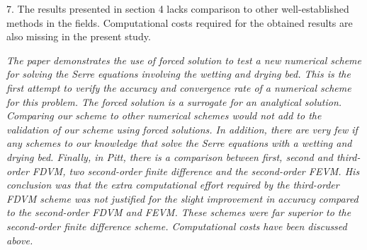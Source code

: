 \documentclass[subeqn]{article}
\begin{document}
7. The results presented in section 4 lacks comparison to other well-established methods in the fields. Computational costs required for the obtained results are also missing in the present study.

\emph{The paper demonstrates the use of forced solution to test a new numerical scheme for solving the Serre equations involving the wetting and drying bed. This is the first attempt to verify the accuracy and convergence rate of a numerical scheme for this problem. The forced solution is a surrogate for an analytical solution. Comparing our scheme to other numerical schemes would not add to the validation of our scheme using forced solutions.   In addition, there are   very few if any schemes to our knowledge that solve the Serre equations with a wetting and drying bed. Finally, in Pitt\cite{Pitt-2018-61}, there is a comparison between first, second and third-order FDVM, two second-order finite difference and the second-order FEVM. His conclusion was that the extra computational effort required by the third-order FDVM scheme was not justified for the slight improvement in accuracy compared to the second-order FDVM and FEVM. These schemes were far superior to the second-order finite difference scheme.
Computational costs have been discussed above.}
\end{document}
